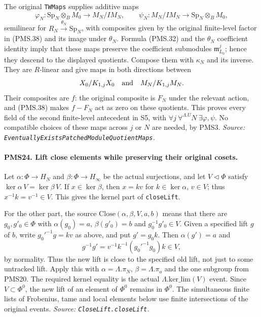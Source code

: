 The original \texttt{TWMaps} supplies additive maps
\[
 \varphi_N:\mathrm{Sp}_N\otimes_B M_0\longrightarrow M_N/IM_N,
 \qquad
 \psi_N:M_N/IM_N\longrightarrow\mathrm{Sp}_N\otimes_B M_0,
\]
semilinear for $R_N\xrightarrow{\theta_N}\mathrm{Sp}_N$,
with composites given by the original finite-level factor in
(PMS.38) and its image under $\theta_N$.
Formula (PMS.32) and the $\theta_N$ coefficient identity imply
that these maps preserve the coefficient submodules
$\mathfrak m_{L_0}^j$; hence they descend to the displayed
quotients.  Compose them with $\kappa_N$ and its inverse.
They are $R$-linear and give maps in both directions between
\[
 X_0/K_{1,j}X_0
 \quad\hbox{and}\quad M_N/K_{1,j}M_N.
\]
Their composites are $f$: the original composite is $F_N$
under the relevant action, and (PMS.38) makes $f-F_N$ act
as zero on these quotients.  This proves every field of the
second finite-level antecedent in S5, with
$\forall j\ \forall^{\Lambda.U}N\ \exists\varphi,\psi$.
No compatible choices of these maps across $j$ or $N$ are
needed, by PMS3.
\hfill\textit{Source: \texttt{EventuallyExistsPatchedModuleQuotientMaps}.}

\paragraph{PMS24. Lift close elements while preserving their original cosets.}
\label{claim:PMS24}
Let $\alpha:\Phi\to H_N$ and $\beta:\Phi\to H_\infty$
be the actual surjections, and let $V\triangleleft\Phi$
satisfy $\ker\alpha\,V=\ker\beta\,V$.
If $x\in\ker\beta$, then $x=kv$ for
$k\in\ker\alpha$, $v\in V$; thus $x^{-1}k=v^{-1}\in V$.
This gives the kernel part of \texttt{closeLift}.

For the other part, the source
$\mathrm{Close}(\alpha,\beta,V,a,b)$ means that there are
$g_0,g'_0\in\Phi$ with
$\alpha(g_0)=a$, $\beta(g'_0)=b$ and $g_0^{-1}g'_0\in V$.
Given a specified lift $g$ of $b$, write
$g_0'^{-1}g=kv$ as above, and put $g'=g_0k$.
Then $\alpha(g')=a$ and
\[
 g^{-1}g'=v^{-1}k^{-1}(g_0'^{-1}g_0)k\in V,
\]
by normality.  Thus the new lift is close to the specified old
lift, not just to some untracked lift.
Apply this with $\alpha=\Lambda.\pi_N$,
$\beta=\Lambda.\pi_o$ and the one subgroup from PMS20.
The required kernel equality is the actual
$\Lambda.\mathrm{ker\_lim}(V)$ event.  Since $V\subset\Phi^0$,
the new lift of an element of $\Phi^0$ remains in $\Phi^0$.
The simultaneous finite lists of Frobenius, tame and local
elements below use finite intersections of the original events.
\hfill\textit{Source: \texttt{CloseLift.closeLift}.}

